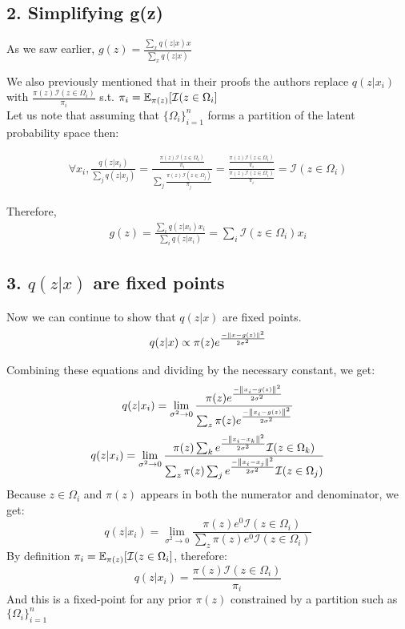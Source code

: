\subsection*{2. Simplifying g(z)}
As we saw earlier, $g(z)=\frac{\sum_{x}{q(z|x) x}}{\sum_{x}{q(z|x)}}$

We also previously mentioned that in their proofs the authors replace $q(z|x_{i})$ with $\frac{\pi(z)\mathcal{I}({z\in\Omega_{i}})}{\pi_{i}}$ s.t. $\pi_{i} = \operatorname{\mathbb{E}}_{\pi(z)}[\mathcal{I}(z\in\Omega_{i}]$\\
Let us note that assuming that $\lbrace{{\Omega_i}\rbrace}_{i=1}^n$ forms a partition of the latent probability space then:

\begin{gather*}
\forall x_i, \frac{q(z|x_i)}{\sum_j q(z|x_j)} = \frac{\frac{\pi(z)\mathcal{I}({z\in\Omega_{i}})}{\pi_{i}}}{\sum_j \frac{\pi(z)\mathcal{I}({z\in\Omega_{j}})}{\pi_{j}}} = \frac{\frac{\pi(z)\mathcal{I}({z\in\Omega_{i}})}{\pi_{i}}}{\frac{\pi(z)\mathcal{I}({z\in\Omega_{i}})}{\pi_{i}}} = \mathcal{I}(z\in\Omega_i)
\end{gather*}

Therefore,
\begin{gather*}
g(z)=\frac{\sum_{i}{q(z|x_i) x_i}}{\sum_{i}{q(z|x_i)}} = \sum_i \mathcal{I}(z\in\Omega_i)x_i
\end{gather*}

\subsection*{3. $q(z|x)$ are fixed points}
Now we can continue to show that $q(z|x)$ are fixed points.\\

\begin{gather*}
q(z|x) \propto \pi(z)e^\frac{-\left\lVert x-g(z)\right\rVert^2}{2\sigma^2}
\end{gather*}

Combining these equations and dividing by the necessary constant, we get:
\setcounter{equation}{0}
\begin{equation}
q(z|x_i) = \lim_{\sigma^2\to0}\frac{\pi(z)e^\frac{-\left\lVert x_i-g(z)\right\rVert^2}{2\sigma^2}}{\sum_z\pi(z)e^\frac{-\left\lVert x_i-g(z)\right\rVert^2}{2\sigma^2}}
\end{equation}
\begin{equation}
q(z|x_i) = \lim_{\sigma^2\to0}\frac{\pi(z)\sum_k e^\frac{-\left\lVert x_i- x_k\right\rVert^2}{2\sigma^2}\mathcal{I}(z\in\Omega_k)}{\sum_z\pi(z)\sum_j e^\frac{-\left\lVert x_i- x_j\right\rVert^2}{2\sigma^2}\mathcal{I}(z\in\Omega_j)}
\end{equation}
Because $z\in\Omega_i$ and $\pi(z)$ appears in both the numerator and denominator, we get:
\begin{equation}
q(z|x_i) = \lim_{\sigma^2\to0}\frac{\pi(z) e^0 \mathcal{I}(z\in\Omega_i)}{\sum_z\pi(z) e^0 \mathcal{I}(z\in\Omega_i)}
\end{equation}
By definition $\pi_{i} = \operatorname{\mathbb{E}}_{\pi(z)}[\mathcal{I}(z\in\Omega_{i}]$, therefore:
\begin{equation}
q(z|x_i) = \frac{\pi(z)\mathcal{I}(z\in\Omega_i)}{\pi_i}
\end{equation}
And this is a fixed-point for any prior $\pi(z)$ constrained by a partition such as $\lbrace{{\Omega_i}\rbrace}_{i=1}^n$

